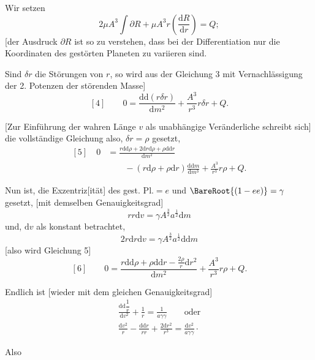 \par
\noindent\hspace*{\parindent}Wir setzen
\[
2\mu A^{3}\int\partial R+\mu A^{3}r\left(\frac{\mathrm{d}R}{\mathrm{d}r}\right)=Q;
\]
[der Ausdruck \(\partial R\) ist so zu verstehen, dass bei der Differentiation nur die Koordinaten des gestörten Planeten zu variieren sind.
\par
\noindent\hspace*{\parindent}Sind \(\delta r\) die Störungen von \(r\), so wird aus der Gleichung 3 mit Vernachlässigung der 2. Potenzen der störenden Masse]
\[
[4]\qquad 0=\frac{\mathrm{d}\mathrm{d}(r\delta r)}{\mathrm{d}m^{2}}+\frac{A^{3}}{r^{3}}r\delta r+Q.
\]
\par
\noindent\hspace*{\parindent}[Zur Einführung der wahren Länge \(v\) als unabhängige Veränderliche schreibt sich] die vollständige Gleichung also, \(\delta r=\rho\) gesetzt,
\[
\begin{aligned}
[5]\quad 0&=\frac{r\mathrm{d}\mathrm{d}\rho+2\mathrm{d}r\mathrm{d}\rho+\rho\mathrm{d}\mathrm{d}r}{\mathrm{d}m^{2}}\\
&\qquad-(r\mathrm{d}\rho+\rho\mathrm{d}r)\frac{\mathrm{d}\mathrm{d}m}{\mathrm{d}m^{3}}+\frac{A^{3}}{r^{3}}r\rho+Q.
\end{aligned}
\]
\par
\noindent\hspace*{\parindent}Nun ist, die Exzentriz[ität] des gest. Pl.\(=e\) und \(\BareRoot{(1-ee)}=\gamma\) gesetzt, [mit demselben Genauigkeitsgrad]
\[
rr\mathrm{d}v=\gamma A^{\frac32}a^{\frac12}\mathrm{d}m
\]
und, \(\mathrm{d}v\) als konstant betrachtet,
\[
2r\mathrm{d}r\mathrm{d}v=\gamma A^{\frac32}a^{\frac12}\mathrm{d}\mathrm{d}m
\]
[also wird Gleichung 5]
\[
[6]\qquad 0=\frac{r\mathrm{d}\mathrm{d}\rho+\rho\mathrm{d}\mathrm{d}r-\frac{2\rho}{r}\mathrm{d}r^{2}}{\mathrm{d}m^{2}}+\frac{A^{3}}{r^{3}}r\rho+Q.
\]
\par
\noindent\hspace*{\parindent}Endlich ist [wieder mit dem gleichen Genauigkeitsgrad]
\[
\begin{gathered}
\frac{\mathrm{d}\mathrm{d}\dfrac1r}{\mathrm{d}v^{2}}+\frac1r=\frac1{a\gamma\gamma}\qquad\text{oder}\\[4pt]
\frac{\mathrm{d}v^{2}}{r}-\frac{\mathrm{d}\mathrm{d}r}{rr}+\frac{2\mathrm{d}r^{2}}{r^{3}}=\frac{\mathrm{d}v^{2}}{a\gamma\gamma}\mathpunct{\cdot}
\end{gathered}
\]
\par
\noindent\hspace*{\parindent}Also
